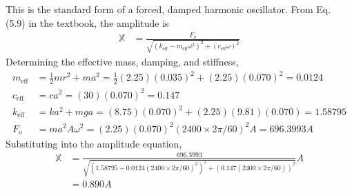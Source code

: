 \subsection{}
This is the standard form of a forced, damped harmonic oscillator. From Eq. (5.9) in the textbook, the amplitude is 
\begin{align*}
    \mathbb{X} &= \frac{F_o}{\sqrt{\left(k_{\text{eff}} - m_{\text{eff}} \omega^2 \right)^2 + \left(c_{\text{eff}} \omega \right)^2}}
\end{align*}
Determining the effective mass, damping, and stiffness,
\begin{align*}
    m_{\text{eff}} &= \frac{1}{2} m r^2 + m a^2 = \frac{1}{2} (2.25)(0.035)^2 + (2.25)(0.070)^2 = 0.0124 \\
    c_{\text{eff}} &= c a^2 = (30)(0.070)^2 = 0.147 \\
    k_{\text{eff}} &= k a^2 + m g a = (8.75)(0.070)^2 + (2.25)(9.81)(0.070) = 1.58795 \\
    F_o &= m a^2 A \omega^2 = (2.25)(0.070)^2 (2400 \times 2\pi / 60)^2 A= 696.3993 A
\end{align*}
Substituting into the amplitude equation,
\begin{align*}
    \mathbb{X} &= \frac{696.3993}{\sqrt{\left(1.58795 - 0.0124 (2400 \times 2\pi / 60)^2 \right)^2 + \left(0.147 (2400 \times 2\pi / 60) \right)^2}} A \\
    &= \boxed{0.890 A}
\end{align*}